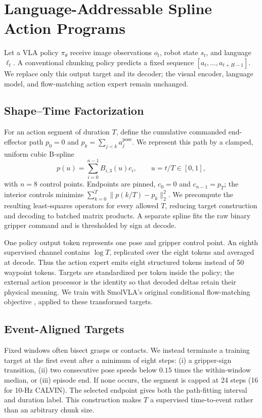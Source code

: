 \section{Language-Addressable Spline Action Programs}
\label{sec:method}

Let a VLA policy $\pi_\theta$ receive image observations $o_t$, robot state $s_t$, and language $\ell_t$. A conventional chunking policy predicts a fixed sequence $[a_t,\ldots,a_{t+H-1}]$. We replace only this output target and its decoder; the visual encoder, language model, and flow-matching action expert remain unchanged.

\subsection{Shape--Time Factorization}

For an action segment of duration $T$, define the cumulative commanded end-effector path $p_0=0$ and $p_k=\sum_{j<k}a^{\mathrm{pose}}_j$. We represent this path by a clamped, uniform cubic B-spline
\begin{equation}
    p(u)=\sum_{i=0}^{n-1}B_{i,3}(u)c_i, \qquad u=t/T\in[0,1],
    \label{eq:spline}
\end{equation}
with $n=8$ control points. Endpoints are pinned, $c_0=0$ and $c_{n-1}=p_T$; the interior controls minimize $\sum_{k=0}^{T}\|p(k/T)-p_k\|_2^2$. We precompute the resulting least-squares operators for every allowed $T$, reducing target construction and decoding to batched matrix products. A separate spline fits the raw binary gripper command and is thresholded by sign at decode.

One policy output token represents one pose and gripper control point. An eighth supervised channel contains $\log T$, replicated over the eight tokens and averaged at decode. Thus the action expert emits eight structured tokens instead of 50 waypoint tokens. Targets are standardized per token inside the policy; the external action processor is the identity so that decoded deltas retain their physical meaning. We train with SmolVLA's original conditional flow-matching objective \cite{lipman2023flow,shukor2025smolvla}, applied to these transformed targets.

\subsection{Event-Aligned Targets}

Fixed windows often bisect grasps or contacts. We instead terminate a training target at the first event after a minimum of eight steps: (i) a gripper-sign transition, (ii) two consecutive pose speeds below $0.15$ times the within-window median, or (iii) episode end. If none occurs, the segment is capped at 24 steps (16 for 10-Hz CALVIN). The selected endpoint gives both the path-fitting interval and duration label. This construction makes $T$ a supervised time-to-event rather than an arbitrary chunk size.


